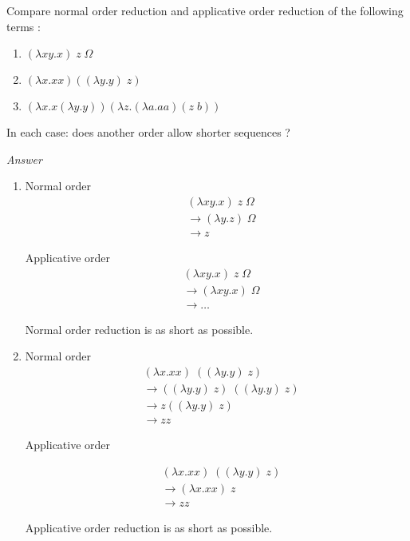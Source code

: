   Compare normal order reduction and applicative order reduction of the
  following terms :

  \begin{enumerate}
    \item $(\lambda xy.x)\;z\;\Omega$
    \item $(\lambda x.xx)((\lambda y.y)\;z)$
    \item $(\lambda x.x(\lambda y.y)) (\lambda z.(\lambda a.aa)(z\;b))$
  \end{enumerate}

  In each case: does another order allow shorter sequences ?

  \textit{Answer}

  \begin{enumerate}
    \item Normal order
      \begin{align*}
        &(\lambda xy.x)\;z\;\Omega\\
        &\to (\lambda y.z)\; \Omega\\
        &\to z
      \end{align*}

      Applicative order
      \begin{align*}
        &(\lambda xy.x)\;z\;\Omega\\
        &\to (\lambda xy.x)\; \Omega\\
        &\to \ldots
      \end{align*}

      Normal order reduction is as short as possible.

    \item Normal order
      \begin{align*}
        &(\lambda x.xx)\;((\lambda y.y)\;z) \\
        &\to ((\lambda y.y)\; z)\;((\lambda y.y)\;z) \\
        &\to z ((\lambda y.y)\;z) \\
        &\to zz
      \end{align*}

      Applicative order

      \begin{align*}
        &(\lambda x.xx)\;((\lambda y.y)\;z) \\
        &\to (\lambda x.xx)\;z \\
        &\to zz
      \end{align*}

      Applicative order reduction is as short as possible.


\end{enumerate}
